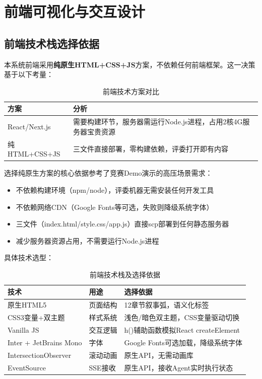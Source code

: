 \documentclass[12pt,a4paper]{ctexrep}
\begin{document}
\chapter{前端可视化与交互设计}

\section{前端技术栈选择依据}

本系统前端采用\textbf{纯原生HTML+CSS+JS}方案，不依赖任何前端框架。这一决策基于以下考量：

\begin{table}[H]
\centering
\caption{前端技术方案对比}
\begin{tabularx}{\textwidth}{lX}
\toprule
\textbf{方案} & \textbf{分析} \\
\midrule
React/Next.js & 需要构建环节，服务器需运行Node.js进程，占用2核4G服务器宝贵资源 \\
纯HTML+CSS+JS & 三文件直接部署，零构建依赖，评委打开即有内容 \\
\bottomrule
\end{tabularx}
\end{table}

选择纯原生方案的核心依据参考了竞赛Demo演示的高压场景需求：
\begin{itemize}
\item 不依赖构建环境（npm/node），评委机器无需安装任何开发工具
\item 不依赖网络CDN（Google Fonts等可选，失败则降级系统字体）
\item 三文件（index.html/style.css/app.js）直接scp部署到任何静态服务器
\item 减少服务器资源占用，不需要运行Node.js进程
\end{itemize}

具体技术选型：
\begin{table}[H]
\centering
\caption{前端技术栈及选择依据}
\begin{tabularx}{\textwidth}{llX}
\toprule
\textbf{技术} & \textbf{用途} & \textbf{选择依据} \\
\midrule
原生HTML5 & 页面结构 & 12章节叙事弧，语义化标签 \\
CSS3变量+双主题 & 样式系统 & 浅色/暗色双主题，CSS变量驱动切换 \\
Vanilla JS & 交互逻辑 & h()辅助函数模拟React createElement \\
Inter + JetBrains Mono & 字体 & Google Fonts可选加载，降级系统字体 \\
IntersectionObserver & 滚动动画 & 原生API，无需动画库 \\
EventSource & SSE接收 & 原生API，接收Agent实时执行状态 \\
\bottomrule
\end{tabularx}
\end{table}
\end{document}
